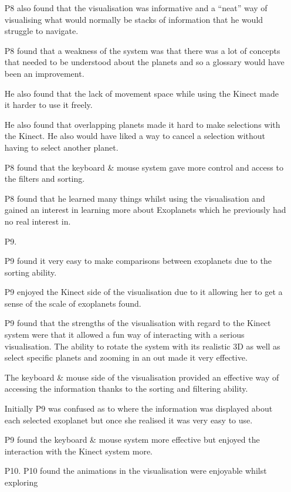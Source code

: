\begin{enumerate}
       P8 also found that the visualisation was informative and a ``neat'' way
of visualising what would normally be stacks of information that he would
struggle to navigate.
       
       P8 found that a weakness of the system was that there was a lot of
concepts that needed to be understood about the planets and so a glossary would
have been an improvement. 
       
       He also found that the lack of movement space while using the Kinect made
it harder to use it freely.
       
       He also found that overlapping planets made it hard to make selections
with the Kinect. He also would have liked a way to cancel a selection without
having to select another planet.
       
       P8 found that the keyboard \& mouse system gave more control and access
to the filters and sorting.
       
       P8 found that he learned many things whilst using the visualisation and
gained an interest in learning more about Exoplanets which he previously had no
real interest in.
      
        \item[P9.]
        
        P9 found it very easy to make comparisons between exoplanets due to the
sorting ability.
        
        
        P9 enjoyed the Kinect side of the visualisation due to it allowing her
to get a sense of the scale of exoplanets found.
        
        P9 found that the strengths of the visualisation with regard to the
Kinect system were that it allowed a fun way of interacting with a serious
visualisation. The ability to rotate the system with its realistic 3D as well as
select specific planets and zooming in an out made it very effective.
        
        The keyboard \& mouse side of the visualisation provided an effective
way of accessing the information thanks to the sorting and filtering ability.
        
        Initially P9 was confused as to where the information was displayed
about each selected exoplanet but once she realised it was very easy to use.
        
        P9 found the keyboard \& mouse system more effective but enjoyed the
interaction with the Kinect system more.
        
         \item[P10.]
         P10 found the animations in the visualisation were enjoyable whilst
exploring
         

\end{enumerate}
